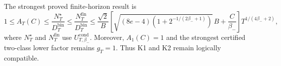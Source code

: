 The strongest proved finite-horizon result is \[1\le A_T(C)\le\frac{N_T^\star}{D_T^{\mathrm{bin}}}\le\frac{N_T^{\mathrm{fin}}}{D_T^{\mathrm{bin}}}\le\frac{\sqrt2}{B}\left[\sqrt{(8e-4)\left(1+2^{-1/(2\beta_-+1)}\right)}\,B+\frac C{\beta_-}\right]T^{1/(4\beta_-+2)},\] where \(N_T^\star\) and \(N_T^{\mathrm{fin}}\) use \(U_{T,\beta_-}^{\mathrm{cond}}\). Moreover, \(A_1(C)=1\) and the strongest certified two-class lower factor remains \(g_T=1\). Thus K1 and K2 remain logically compatible.